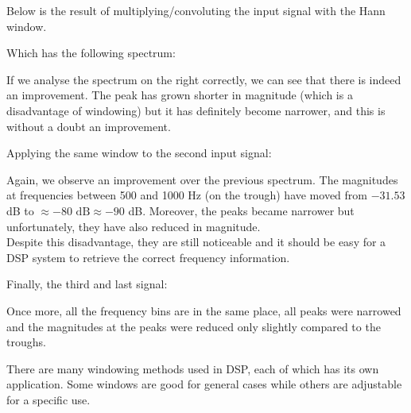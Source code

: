 Below is the result of multiplying/convoluting the input signal with the Hann window.

\newpage
Which has the following spectrum:

If we analyse the spectrum on the right correctly, we can see that there is indeed an improvement. The peak has grown shorter in magnitude (which is a disadvantage of windowing) but it has definitely become narrower, and this is without a doubt an improvement. 

\newpage
Applying the same window to the second input signal:


Again, we observe an improvement over the previous spectrum. The magnitudes at frequencies between 500 and 1000 Hz (on the trough) have moved from $-31.53$ dB to $\approx -80 \text{ dB} \approx -90$ dB. Moreover, the peaks became narrower but unfortunately, they have also reduced in magnitude.\\

Despite this disadvantage, they are still noticeable and it should be easy for a DSP system to retrieve the correct frequency information.

\newpage
Finally, the third and last signal:


Once more, all the frequency bins are in the same place, all peaks were narrowed and the magnitudes at the peaks were reduced only slightly compared to the troughs.

There are many windowing methods used in DSP, each of which has its own application. Some windows are good for general cases while others are adjustable for a specific use.

